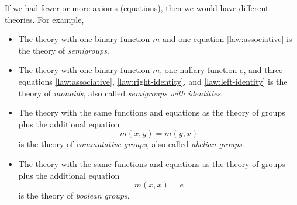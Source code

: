 \documentclass[11pt]{article}
\begin{document}
If we had fewer or more axioms (equations), then we would have different
theories.  For example,
\begin{itemize}
\item The theory with one binary function $m$ and one equation
    \eqref{law:associative} is the theory of \emph{semigroups}.
\item The theory with one binary function $m$, one nullary function $e$,
    and three equations \eqref{law:associative}, \eqref{law:right-identity},
    and \eqref{law:left-identity} is the theory of \emph{monoids},
    also called \emph{semigroups with identities}.
\item The theory with the same functions and equations as the theory
    of groups plus the additional equation
\begin{equation} \label{law:commutative}
    m(x, y) = m(y, x)
\end{equation}
    is the theory of \emph{commutative groups},
    also called \emph{abelian groups}.
\item The theory with the same functions and equations as the theory
    of groups plus the additional equation
\begin{equation} \label{law:boolean}
    m(x, x) = e
\end{equation}
    is the theory of \emph{boolean groups}.
\end{itemize}
\end{document}
